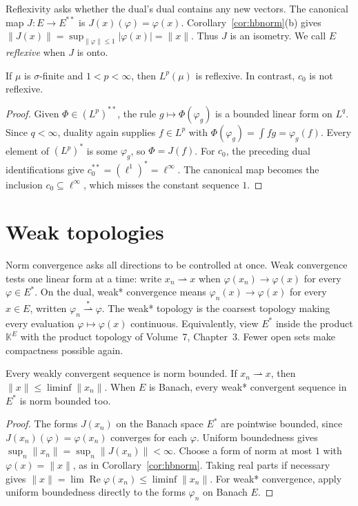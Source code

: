 Reflexivity asks whether the dual's dual contains any new vectors. The canonical map $J:E\to E^{**}$ is $J(x)(\varphi)=\varphi(x)$. Corollary~\ref{cor:hbnorm}(b) gives $\|J(x)\|=\sup_{\|\varphi\|\le1}|\varphi(x)|=\|x\|$. Thus $J$ is an isometry. We call $E$ \emph{reflexive} when $J$ is onto.

\begin{proposition}\label{prop:reflexive}
If $\mu$ is $\sigma$-finite and $1<p<\infty$, then $L^p(\mu)$ is reflexive. In contrast, $c_0$ is not reflexive.
\end{proposition}
\begin{proof}
Given $\Phi\in(L^p)^{**}$, the rule $g\mapsto\Phi(\varphi_g)$ is a bounded linear form on $L^q$. Since $q<\infty$, duality again supplies $f\in L^p$ with $\Phi(\varphi_g)=\int fg=\varphi_g(f)$. Every element of $(L^p)^*$ is some $\varphi_g$, so $\Phi=J(f)$. For $c_0$, the preceding dual identifications give $c_0^{**}=(\ell^1)^*=\ell^\infty$. The canonical map becomes the inclusion $c_0\subseteq\ell^\infty$, which misses the constant sequence $1$.
\end{proof}

\section{Weak topologies}

Norm convergence asks all directions to be controlled at once. Weak convergence tests one linear form at a time: write $x_n\rightharpoonup x$ when $\varphi(x_n)\to\varphi(x)$ for every $\varphi\in E^*$. On the dual, weak* convergence means $\varphi_n(x)\to\varphi(x)$ for every $x\in E$, written $\varphi_n\overset*\rightharpoonup\varphi$. The weak* topology is the coarsest topology making every evaluation $\varphi\mapsto\varphi(x)$ continuous. Equivalently, view $E^*$ inside the product $\mathbb K^E$ with the product topology of Volume~7, Chapter~3. Fewer open sets make compactness possible again.

\begin{proposition}\label{prop:weakbounded}
Every weakly convergent sequence is norm bounded. If $x_n\rightharpoonup x$, then $\|x\|\le\liminf\|x_n\|$. When $E$ is Banach, every weak* convergent sequence in $E^*$ is norm bounded too.
\end{proposition}
\begin{proof}
The forms $J(x_n)$ on the Banach space $E^*$ are pointwise bounded, since $J(x_n)(\varphi)=\varphi(x_n)$ converges for each $\varphi$. Uniform boundedness gives $\sup_n\|x_n\|=\sup_n\|J(x_n)\|<\infty$. Choose a form of norm at most $1$ with $\varphi(x)=\|x\|$, as in Corollary~\ref{cor:hbnorm}. Taking real parts if necessary gives $\|x\|=\lim\operatorname{Re}\varphi(x_n)\le\liminf\|x_n\|$. For weak* convergence, apply uniform boundedness directly to the forms $\varphi_n$ on Banach $E$.
\end{proof}

